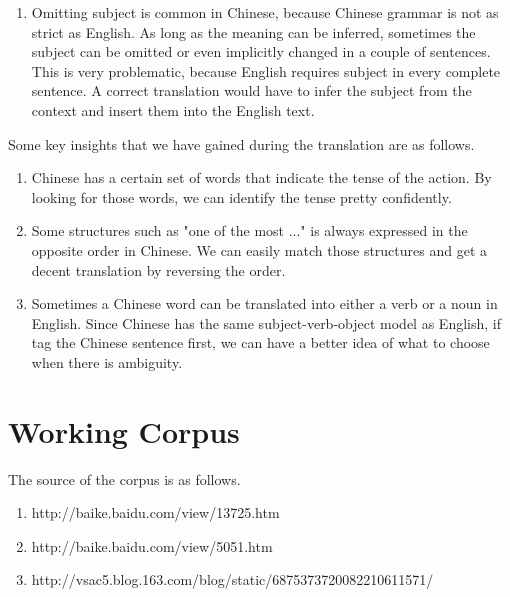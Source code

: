 \documentclass[11pt]{article} %
\begin{document}
\begin{CJK}{UTF8}{gbsn}
\begin{enumerate}
\item Omitting subject is common in Chinese, because Chinese grammar is not as strict as English. As long as the meaning can be inferred, sometimes the subject can be omitted or even implicitly changed in a couple of sentences. This is very problematic, because English requires subject in every complete sentence. A correct translation would have to infer the subject from the context and insert them into the English text.
\end{enumerate}
Some key insights that we have gained during the translation are as follows.
\begin{enumerate}
\item Chinese has a certain set of words that indicate the tense of the action.
By looking for those words, we can identify the tense pretty confidently.

\item Some structures such as "one of the most ..." is always expressed in the opposite order in Chinese. We can easily match those structures and get a decent translation by reversing the order.

\item Sometimes a Chinese word can be translated into either a verb or a noun in English. Since Chinese has the same subject-verb-object model as English, if tag the Chinese sentence first, we can have a better idea of what to choose when there is ambiguity.  
\end{enumerate}


\section{Working Corpus}
The source of the corpus is as follows.
\begin{enumerate}
\item http://baike.baidu.com/view/13725.htm
\item http://baike.baidu.com/view/5051.htm
\item http://vsac5.blog.163.com/blog/static/6875373720082210611571/
\end{enumerate}

\end{CJK}
\end{document}
